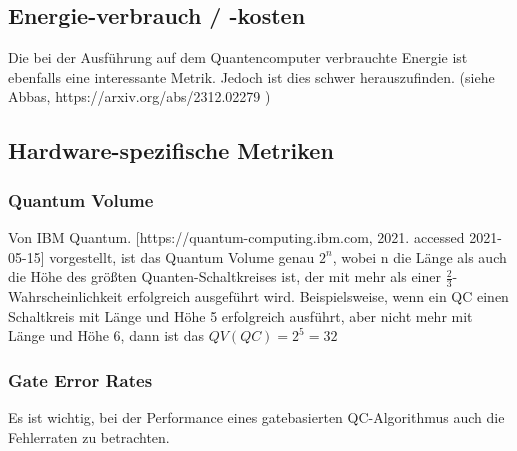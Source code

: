 \subsection{Energie-verbrauch / -kosten}
Die bei der Ausführung auf dem Quantencomputer verbrauchte Energie ist ebenfalls eine interessante Metrik. Jedoch ist dies schwer herauszufinden. (siehe Abbas, https://arxiv.org/abs/2312.02279 )


\subsection{Hardware-spezifische Metriken}


\subsubsection{Quantum Volume}
Von IBM Quantum. [https://quantum-computing.ibm.com, 2021. accessed 2021-05-15] vorgestellt, ist das Quantum Volume genau $2^{n} $, wobei n die Länge als auch die Höhe des größten Quanten-Schaltkreises ist, der mit mehr als einer $ \frac{2}{3} $-Wahrscheinlichkeit erfolgreich ausgeführt wird.
Beispielsweise, wenn ein QC einen Schaltkreis mit Länge und Höhe 5 erfolgreich ausführt, aber nicht mehr mit Länge und Höhe 6, dann ist das $ QV(QC) = 2^{5} = 32 $

\subsubsection{Gate Error Rates}
Es ist wichtig, bei der Performance eines gatebasierten QC-Algorithmus auch die Fehlerraten zu betrachten.





